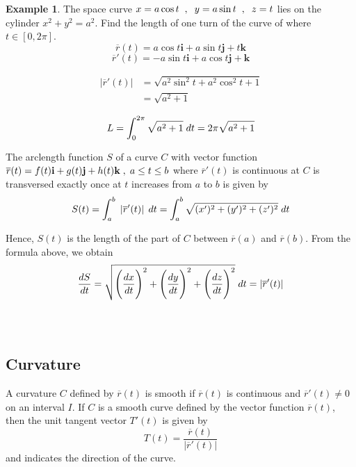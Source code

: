 \documentclass[11pt,a4paper]{article}
\theoremstyle{definition}
\newtheorem{exa}[thm]{Example}
\begin{document}
\begin{exa}


The space curve $x = a\cos t\hspace{0.2cm}, \hspace{0.2cm} y = a\sin t \hspace{0.2cm}, \hspace{0.2cm} z = t$ lies on the cylinder $x^2 + y^2 = a^2$. Find the length of one turn of the curve of where $t \in [0, 2\pi]$. $$\overline{r}(t) = a\cos t \textbf{i} + a\sin t \textbf{j} + t\textbf{k}$$
$$\overline{r}'(t) = -a\sin t \textbf{i} + a\cos t \textbf{j} + \textbf{k}$$

\begin{align*}
\left|\overline{r}'(t)\right| & = \sqrt{a^2\sin^2t  + a^2\cos^2t + 1}\\
& = \sqrt{a^2 + 1}
\end{align*}

$$L = \int^{2\pi}_0 \sqrt{a^2 + 1}\hspace{0.1cm}dt = 2\pi \sqrt{a^2 + 1}$$


The arclength function $S$ of a curve $C$ with vector function $\overline{r}(t)  = f(t)\textbf{i} + g(t) \textbf{j} + h(t)\textbf{k}\hspace{0.1cm}, \hspace{0.1cm} a\leq t \leq b$ where $\overline{r}'(t)$ is continuous at $C$ is transversed exactly once at $t$ increases from $a$ to $b$ is given by $$S(t) = \int^b_a\hspace{0.1cm}\left|\overline{r}'(t)\right|\hspace{0.1cm}dt = \int^b_a \sqrt{(x')^2 + (y')^2 +(z')^2}\hspace{0.1cm}dt$$

Hence, $S(t)$ is the length of the part of $C$ between $\overline{r}(a)$ and $\overline{r}(b)$. From the formula above, we obtain $$\frac{dS}{dt} = \sqrt{\Bigg(\dfrac{dx}{dt}\Bigg)^2 + \Bigg(\dfrac{dy}{dt}\Bigg)^2 + \Bigg(\dfrac{dz}{dt}\Bigg)^2}\hspace{0.1cm}dt = \left|\overline{r}'(t)\right|$$\\\\
\end{exa}

\subsection{Curvature}
A curvature $C$  defined by $\overline{r}(t)$ is smooth if $\overline{r}(t)$ is continuous and $\overline{r}'(t) \neq 0$ on an interval $I$. If $C$ is a smooth curve defined by the vector function $\overline{r}(t)$, then the unit tangent vector $T'(t)$ is given by $$ T(t) = \frac{\overline{r}(t)}{\left|\overline{r}'(t)\right|
}$$ and indicates the direction of the curve.
\end{document}
